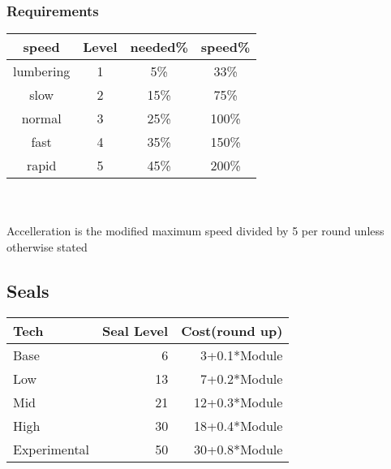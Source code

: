\documentclass{article}
\begin{document}
    \subsubsection{Requirements}
    \begin{tabular}{c|c|c|c}
        speed       &Level  &needed\%& speed\% \\\hline
        lumbering   &1      &5\%     &33\%\\
        slow        &2      &15\%    &75\%\\
        normal      &3      &25\%    &100\%\\
        fast        &4      &35\%    &150\%\\
        rapid       &5      &45\%    &200\%\\
    \end{tabular}\\\newline\\
    Accelleration is the modified maximum speed divided by 5 per round unless otherwise stated
    \subsection{Seals}
    \begin{tabular}{l|r|r}
        Tech & Seal Level & Cost(round up)\\\hline
        Base &  6 &  3+0.1*Module\\
        Low &   13&  7+0.2*Module\\
        Mid &   21&  12+0.3*Module\\
        High &  30&  18+0.4*Module\\
        Experimental & 50&30+0.8*Module\\
    \end{tabular}\\
\end{document}
